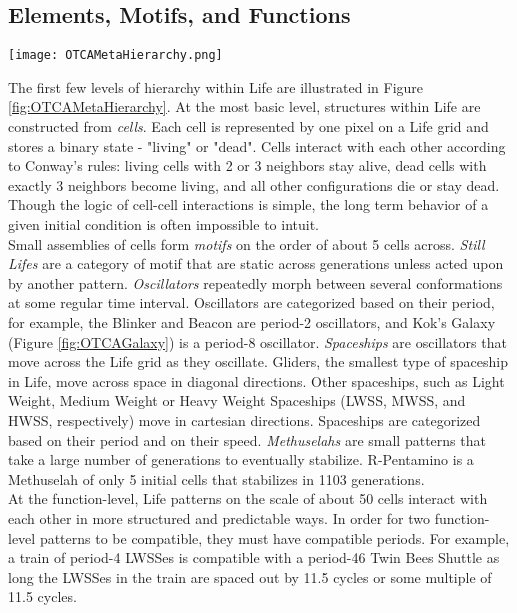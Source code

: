 {\subsection{Elements, Motifs, and Functions}

\begin{sidewaysfigure}
  \texttt{[image: OTCAMetaHierarchy.png]}
  \caption{Hierarchical breakdown of OTCA Metapixel into modules, functions, motifs, and elements.  Complex-level diagram is shown in Figure \ref{fig:OTCADiagram}.}
  \label{fig:OTCAMetaHierarchy}
\end{sidewaysfigure}

The first few levels of hierarchy within Life are illustrated in Figure \ref{fig:OTCAMetaHierarchy}.  At the most basic level, structures within Life are constructed from \textit{cells}.  Each cell is represented by one pixel on a Life grid and stores a binary state - "living" or "dead".  Cells interact with each other according to Conway's rules: living cells with 2 or 3 neighbors stay alive, dead cells with exactly 3 neighbors become living, and all other configurations die or stay dead.  Though the logic of cell-cell interactions is simple, the long term behavior of a given initial condition is often impossible to intuit. \\

Small assemblies of cells form \textit{motifs} on the order of about 5 cells across.  \textit{Still Lifes} are a category of motif that are static across generations unless acted upon by another pattern.  \textit{Oscillators} repeatedly morph between several conformations at some regular time interval.  Oscillators are categorized based on their period, for example, the Blinker and Beacon are period-2 oscillators, and Kok's Galaxy (Figure \ref{fig:OTCAGalaxy}) is a period-8 oscillator.  \textit{Spaceships} are oscillators that move across the Life grid as they oscillate.  Gliders, the smallest type of spaceship in Life, move across space in diagonal directions.  Other spaceships, such as Light Weight, Medium Weight or Heavy Weight Spaceships (LWSS, MWSS, and HWSS, respectively) move in cartesian directions.  Spaceships are categorized based on their period and on their speed.  \textit{Methuselahs} are small patterns that take a large number of generations to eventually stabilize.  R-Pentamino is a Methuselah of only 5 initial cells that stabilizes in 1103 generations.\\

At the function-level, Life patterns on the scale of about 50 cells interact with each other in more structured and predictable ways.  In order for two function-level patterns to be compatible, they must have compatible periods.  For example, a train of period-4 LWSSes is compatible with a period-46 Twin Bees Shuttle as long the LWSSes in the train are spaced out by 11.5 cycles or some multiple of 11.5 cycles.\\

}
